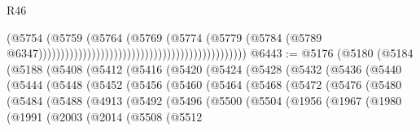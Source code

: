 \begin{lexlean}{R46}
\begin{coremodule}
                                                                                  (@5754
                                                                                    (@5759
                                                                                      (@5764
                                                                                        (@5769
                                                                                          (@5774
                                                                                            (@5779
                                                                                              (@5784
                                                                                                (@5789
                                                                                                  @6347)))))))))))))))))))))))))))))))))))))))))))))))
@6443 := @5176
    (@5180
      (@5184
        (@5188
          (@5408
            (@5412
              (@5416
                (@5420
                  (@5424
                    (@5428
                      (@5432
                        (@5436
                          (@5440
                            (@5444
                              (@5448
                                (@5452
                                  (@5456
                                    (@5460
                                      (@5464
                                        (@5468
                                          (@5472
                                            (@5476
                                              (@5480
                                                (@5484
                                                  (@5488
                                                    (@4913
                                                      (@5492
                                                        (@5496
                                                          (@5500
                                                            (@5504
                                                              (@1956
                                                                (@1967
                                                                  (@1980
                                                                    (@1991
                                                                      (@2003
                                                                        (@2014
                                                                          (@5508
                                                                            (@5512

\end{coremodule}
\end{lexlean}
